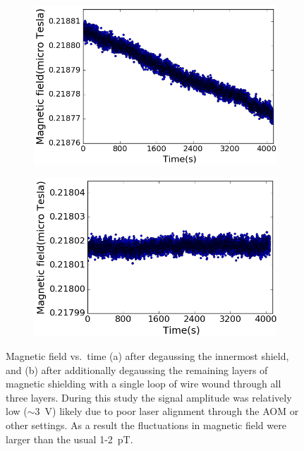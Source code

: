 \begin{figure}
  \centering
  \begin{subfigure}[b]{0.48\textwidth}
    \centering
    \includegraphics[width=\textwidth]{figures/before_degaussing}
    \caption{}
    \label{fig:with DG_innermost}
  \end{subfigure}
  \hfill
  \begin{subfigure}[b]{0.48\textwidth}
    \centering
    \includegraphics[width=\textwidth]{figures/after_degaussing.png}
    \caption{}
    \label{fig:with DG}
  \end{subfigure}
  \caption{Magnetic field vs.~time (a) after degaussing the innermost
    shield, and (b) after additionally degaussing the remaining layers
    of magnetic shielding with a single loop of wire wound through all
    three layers. During this study the signal amplitude was
    relatively low ($\sim 3$~V) likely due to poor laser alignment
    through the AOM or other settings. As a result the fluctuations in
    magnetic field were larger than the usual 1-2~pT.\label{fig:effect
      of DG}}
\end{figure}

